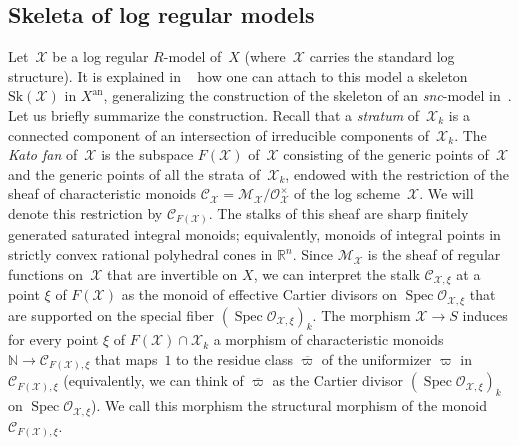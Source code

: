 \documentclass[11pt]{article}
\let\mathcal\mathscr
\theoremstyle{definition}
\numberwithin{equation}{subsection}
\newcommand{\N}{\ensuremath{\mathbb{N}}}
\newcommand{\R}{\ensuremath{\mathbb{R}}}
\newcommand{\cX}{\ensuremath{\mathscr{X}}}
\newcommand{\snc}{\textit{snc}}
\newcommand{\an}{\mathrm{an}}
\newcommand{\Sk}{\mathrm{Sk}}
\DeclareMathOperator{\Spec}{Spec}
\let\unif\varpi
\begin{document}
\subsection{Skeleta of log regular models}\label{ss:logskeleta}
Let~$\cX$ be a log regular $R$\nobreakdash-model of~$X$ (where~$\cX$ carries the standard log structure). It is explained in ~\cite[\S3]{BrMa} how one can attach to this model a skeleton $\Sk(\cX)$ in $X^{\an}$, generalizing the construction of the skeleton of an \snc-model in~\cite[\S3]{MuNi}. Let us briefly summarize the construction.
Recall that a {\em stratum} of~$\cX_k$ is a connected component of an intersection of irreducible components of~$\cX_k$.
The {\em Kato fan} of~$\cX$
is the subspace $F(\cX)$ of~$\cX$ consisting of the generic points of~$\cX$ and the generic points of all the strata of~$\cX_k$, endowed with the restriction of the sheaf of characteristic monoids $\mathcal{C}_{\cX}=\mathcal{M}_{\cX}/\mathcal{O}^{\times}_{\cX}$ of the log scheme~$\cX$. We will denote this restriction by $\mathcal{C}_{F(\cX)}$. The stalks of this sheaf are
sharp finitely generated saturated integral monoids; equivalently, monoids of integral points in strictly convex rational polyhedral cones in $\R^n$.
Since $\mathcal{M}_{\cX}$ is the sheaf of regular functions on~$\cX$ that are invertible on $X$,
we can interpret the stalk $\mathcal{C}_{\cX,\xi}$ at a point $\xi$ of $F(\cX)$ as the monoid of effective Cartier divisors on $\Spec \mathcal{O}_{\cX,\xi}$ that are supported on the special fiber $(\Spec \mathcal{O}_{\cX,\xi})_k$.
The morphism $\cX\to S$ induces for every point $\xi$ of $F(\cX)\cap \cX_k$ a morphism of characteristic monoids $\N\to \mathcal{C}_{F(\cX),\xi}$ that maps~$1$ to the residue class $\overline{\unif}$ of the uniformizer $\unif$ in $\mathcal{C}_{F(\cX),\xi}$ (equivalently, we can think of $\overline{\unif}$ as the Cartier divisor $(\Spec \mathcal{O}_{\cX,\xi})_k$ on $\Spec \mathcal{O}_{\cX,\xi}$). We call this morphism the structural morphism of the monoid $\mathcal{C}_{F(\cX),\xi}$.
\end{document}

